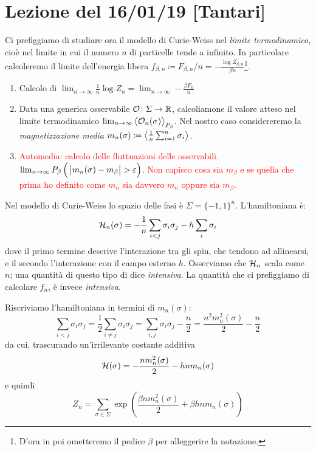\section{Lezione del 16/01/19 [Tantari]}

Ci prefiggiamo di studiare ora il modello di Curie-Weiss nel \emph{limite termodinamico}, cioè nel limite in cui il numero $ n $ di particelle tende a infinito. In particolare calcoleremo il limite dell'energia libera $ f_{\beta, n} \coloneqq F_{\beta, n}/n = -\frac{\log Z_{\beta, n}}{\beta n}$\footnote{D'ora in poi ometteremo il pedice $ \beta $ per alleggerire la notazione.}.

\begin{enumerate}
  \item Calcolo di $ \lim_{n\to\infty} \frac{1}{n} \log{Z_n} = \lim_{n\to\infty} -\frac{\beta F_n}{n} $
  \item Data una generica osservabile $ \mathcal{O}\colon\Sigma\to\mathbb{R} $, calcoliamone il valore atteso nel limite termodinamico $ \lim_{n\to\infty} \left< \mathcal{O}_n(\sigma) \right>_{P_\beta} $. Nel nostro caso considereremo la \emph{magnetizzazione media} $ m_n(\sigma) \coloneqq \left< \frac{1}{n}\sum_{i=1}^{n}\sigma_i \right> $.
  \item \textcolor{red}{Automedia: calcolo delle fluttuazioni delle osservabili}.
  $ \lim_{n\to\infty} P_\beta\left(\ \abs{m_n(\sigma) - m_\beta } > \varepsilon \right) $.
  \textcolor{red}{Non capisco cosa sia $ m_\beta $ e se quella che prima ho definito come $ m_n $ sia davvero $ m_n $ oppure sia $ m_\beta $.} 
\end{enumerate}

Nel modello di Curie-Weiss lo spazio delle fasi è $ \Sigma = \{-1,1\}^n $. L'hamiltoniana è:
\[ \mathcal{H}_n(\sigma) = -\frac{1}{n} \sum_{i<j} \sigma_i \sigma_j - h \sum_i \sigma_i \]
dove il primo termine descrive l'interazione tra gli spin, che tendono ad allinearsi, e il secondo l'interazione con il campo esterno $ h $. Osserviamo che $ \mathcal{H}_n $ scala come $ n $; una quantità di questo tipo di dice \emph{intensiva}. La quantità che ci prefiggiamo di calcolare $ f_n $, è invece \emph{intensiva}.





Riscriviamo l'hamiltoniana in termini di $ m_n(\sigma) $:
\[ \sum_{i<j} \sigma_i \sigma_j = \frac{1}{2} \sum_{i \neq j} \sigma_i \sigma_j = \sum_{i,j} \sigma_i \sigma_j -\frac{n}{2} = \frac{n^2 m_n^2(\sigma)}{2} - \frac{n}{2} \]
da cui, trascurando un'irrilevante costante additiva
\[ \mathcal{H}(\sigma) = -\frac{n m_n^2(\sigma)}{2} - hnm_n(\sigma) \]
e quindi
\[ Z_n = \sum_{\sigma \in \Sigma} \exp\left( \frac{\beta n m_n^2(\sigma)}{2} + \beta h n m_n(\sigma) \right) \]

